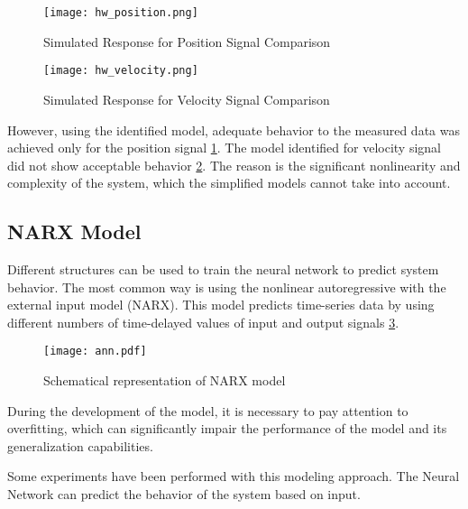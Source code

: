 \begin{figure}[h!]
    \centering
    \texttt{[image: hw\_position.png]}
    \caption{Simulated Response for Position Signal Comparison}
    \label{fig:hw_position}
\end{figure}

\begin{figure}[h!]
    \centering
    \texttt{[image: hw\_velocity.png]}
    \caption{Simulated Response for Velocity Signal Comparison}
    \label{fig:hw_velocity}
\end{figure}

However, using the identified model, adequate behavior to the measured data
was achieved only for the position signal \ref{fig:hw_position}. The model identified
for velocity signal did not show acceptable behavior \ref{fig:hw_velocity}.  The
reason is the significant nonlinearity and complexity of the system, which
the simplified models cannot take into account.



\newpage
\subsection{NARX Model}

Different structures can be used to train the neural network to predict
system behavior. The most common way is using the nonlinear autoregressive
with the external input model (NARX). This model predicts time-series data
by using different numbers of time-delayed values of input and output
signals \ref{fig:ann}.

\begin{figure}[h!]
    \centering
    \texttt{[image: ann.pdf]}
    \caption{Schematical representation of NARX model}
    \label{fig:ann}
\end{figure}


During the development of the model, it is necessary to pay attention to
overfitting, which can significantly impair the performance of the model
and its generalization capabilities.

Some experiments have been performed with this modeling approach. The
Neural Network can predict the behavior of the system based on input.
